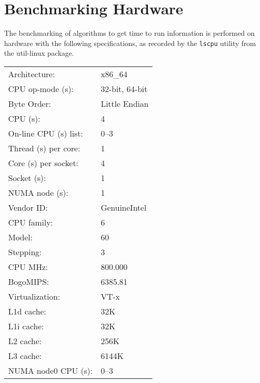 
\section{Benchmarking Hardware}
\label{app:benchmarking_hardware}

The benchmarking of algorithms to get time to run information is performed on
hardware with the following specifications, as recorded by the \texttt{lscpu}
utility from the util-linux package\cite{lscpu}.

\begin{tabular}{l l}
	Architecture:          & x86\_64 \\
	CPU op-mode  (s):      & 32-bit, 64-bit \\
	Byte Order:            & Little Endian \\
	CPU (s):               & 4 \\
	On-line CPU (s) list:  & 0--3 \\
	Thread (s) per core:   & 1 \\
	Core (s) per socket:   & 4 \\
	Socket (s):            & 1 \\
	NUMA node (s):         & 1 \\
	Vendor ID\@:           & GenuineIntel \\
	CPU family:            & 6 \\
	Model:                 & 60 \\
	Stepping:              & 3 \\
	CPU MHz:               & 800.000 \\
	BogoMIPS\@:            & 6385.81 \\
	Virtualization:        & VT-x \\
	L1d cache:             & 32K \\
	L1i cache:             & 32K \\
	L2 cache:              & 256K \\
	L3 cache:              & 6144K \\
	NUMA node0 CPU (s):    & 0--3 \\
\end{tabular}
